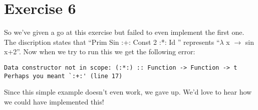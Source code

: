 \documentclass{article}
\begin{document}
\section*{Exercise 6}
So we've given a go at this exercise but failed to even implement the first one. The discription states that ``Prim Sin :+: Const 2 :*: Id '' represents ``$\lambda$ x $\rightarrow$ sin x+2''. Now when we try to run this we get the following error:

\begin{lstlisting}
Data constructor not in scope: (:*:) :: Function -> Function -> t
Perhaps you meant `:+:' (line 17)
\end{lstlisting}
Since this simple example doesn't even work, we gave up. We'd love to hear how we could have implemented this!
\end{document}
